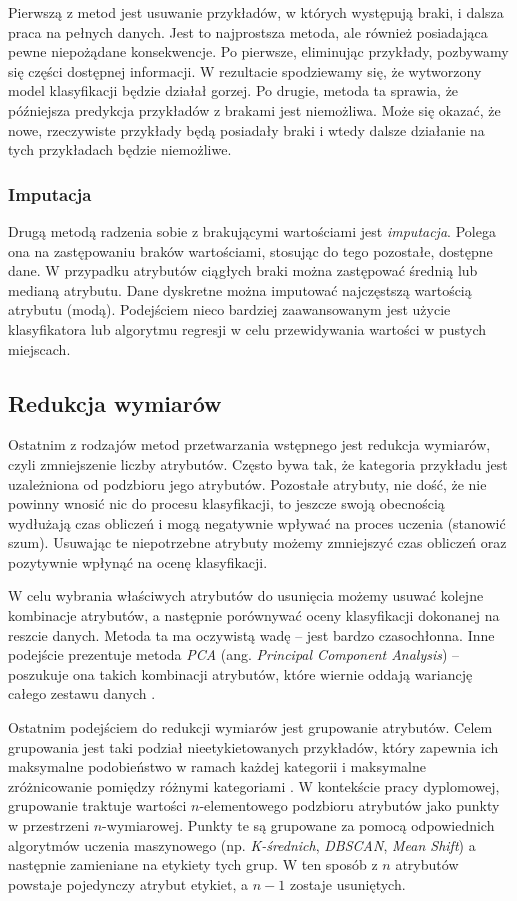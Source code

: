 \documentclass[../thesis.tex]{subfiles}
\begin{document}
Pierwszą z metod jest usuwanie przykładów, w których występują braki, i dalsza praca na pełnych danych. Jest to najprostsza metoda, ale również posiadająca pewne niepożądane konsekwencje. Po pierwsze, eliminując przykłady, pozbywamy się części dostępnej informacji. W rezultacie spodziewamy się, że wytworzony model klasyfikacji będzie działał gorzej. Po drugie, metoda ta sprawia, że późniejsza predykcja przykładów z brakami jest niemożliwa. Może się okazać, że nowe, rzeczywiste przykłady będą posiadały braki i wtedy dalsze działanie na tych przykładach będzie niemożliwe.

\subsubsection{Imputacja}

Drugą metodą radzenia sobie z brakującymi wartościami jest \emph{imputacja}. Polega ona na zastępowaniu braków wartościami, stosując do tego pozostałe, dostępne dane. W przypadku atrybutów ciągłych braki można zastępować średnią lub medianą atrybutu. Dane dyskretne można imputować najczęstszą wartością atrybutu (modą). Podejściem nieco bardziej zaawansowanym jest użycie klasyfikatora lub algorytmu regresji w celu przewidywania wartości w pustych miejscach.

\subsection{Redukcja wymiarów}

Ostatnim z rodzajów metod przetwarzania wstępnego jest redukcja wymiarów, czyli zmniejszenie liczby atrybutów. Często bywa tak, że kategoria przykładu jest uzależniona od podzbioru jego atrybutów. Pozostałe atrybuty, nie dość, że nie powinny wnosić nic do procesu klasyfikacji, to jeszcze swoją obecnością wydłużają czas obliczeń i mogą negatywnie wpływać na proces uczenia (stanowić szum). Usuwając te niepotrzebne atrybuty możemy zmniejszyć czas obliczeń oraz pozytywnie wpłynąć na ocenę klasyfikacji. 

W celu wybrania właściwych atrybutów do usunięcia możemy usuwać kolejne kombinacje atrybutów, a następnie porównywać oceny klasyfikacji dokonanej na reszcie danych. Metoda ta ma oczywistą wadę – jest bardzo czasochłonna. Inne podejście prezentuje metoda \emph{PCA} (ang. \emph{Principal Component Analysis}) – poszukuje ona takich kombinacji atrybutów, które wiernie oddają wariancję całego zestawu danych \cite{def_pca}. 

Ostatnim podejściem do redukcji wymiarów jest grupowanie atrybutów. Celem grupowania jest taki podział nieetykietowanych przykładów, który zapewnia ich maksymalne podobieństwo w ramach każdej kategorii i maksymalne zróżnicowanie pomiędzy różnymi kategoriami \cite{pcichosz}. W kontekście pracy dyplomowej, grupowanie traktuje wartości $n$-elementowego podzbioru atrybutów jako punkty w przestrzeni $n$-wymiarowej. Punkty te są grupowane za pomocą odpowiednich algorytmów uczenia maszynowego (np. \emph{K-średnich}, \emph{DBSCAN}, \emph{Mean Shift}) a następnie zamieniane na etykiety tych grup. W ten sposób z $n$ atrybutów powstaje pojedynczy atrybut etykiet, a $n-1$ zostaje usuniętych.
\end{document}
